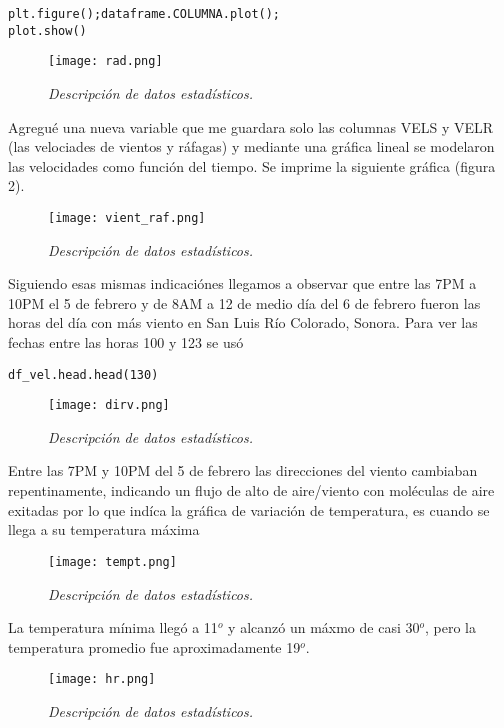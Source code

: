 \documentclass[12pt]{article}
\begin{document}
\begin{verbatim}
plt.figure();dataframe.COLUMNA.plot();
plot.show()
\end{verbatim}
\begin{figure}[H]
\texttt{[image: rad.png]}
\centering
\caption{\emph{\scriptsize{Descripci\'on de datos estad\'isticos.}}}
\end{figure}
Agregu\'e una nueva variable que me guardara solo las columnas VELS y VELR (las velociades de vientos y r\'afagas) y mediante una gr\'afica lineal se modelaron las velocidades como funci\'on del tiempo. Se imprime la siguiente gr\'afica (figura 2). 
\begin{figure}[H]
\texttt{[image: vient\_raf.png]}
\centering
\caption{\emph{\scriptsize{Descripci\'on de datos estad\'isticos.}}}
\end{figure}

Siguiendo esas mismas indicaci\'ones llegamos a observar que entre las 7PM a 10PM el 5 de febrero y de 8AM a 12 de medio d\'ia del 6 de febrero fueron las horas del d\'ia con m\'as viento en San Luis R\'io Colorado, Sonora. Para ver las fechas entre las horas 100 y 123 se us\'o  

\begin{verbatim}
df_vel.head.head(130)
\end{verbatim}

\begin{figure}[H]
\texttt{[image: dirv.png]}
\centering
\caption{\emph{\scriptsize{Descripci\'on de datos estad\'isticos.}}}
\end{figure}
Entre las 7PM y 10PM del 5 de febrero las direcciones del viento cambiaban repentinamente, indicando un flujo de alto de aire/viento con mol\'eculas de aire exitadas por lo que ind\'ica la gr\'afica de variaci\'on de temperatura, es cuando se llega a su temperatura m\'axima 
\begin{figure}[H]
\texttt{[image: tempt.png]}
\centering
\caption{\emph{\scriptsize{Descripci\'on de datos estad\'isticos.}}}
\end{figure}

La temperatura m\'inima lleg\'o a 11$^{o}$ y alcanz\'o un m\'axmo de casi 30$^{o}$, pero la temperatura promedio fue aproximadamente 19$^{o}$. 

\begin{figure}[H]
\texttt{[image: hr.png]}
\centering
\caption{\emph{\scriptsize{Descripci\'on de datos estad\'isticos.}}}
\end{figure}
\end{document}
